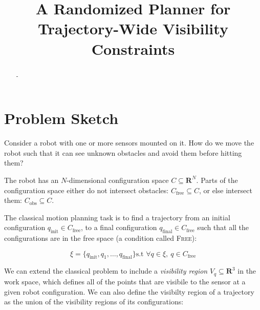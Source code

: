 \documentclass[conference]{IEEEtran}
\begin{document}
\title{A Randomized Planner for Trajectory-Wide Visibility Constraints}

\author{
}

\maketitle


\begin{abstract}
-
\end{abstract}

\IEEEpeerreviewmaketitle

\newcommand{\R}{\mathbf{R}}
\newcommand{\Cfree}{C_{\text{free}}}
\newcommand{\Cobs}{C_{\text{obs}}}
\newcommand{\qinit}{q_{\text{init}}}
\newcommand{\qfinal}{q_{\text{final}}}
\newcommand{\vis}{\textsc{Visible}}
\newcommand{\cfree}{\textsc{Free}}

\section{Problem Sketch}

Consider a robot with one or more sensors mounted on it.  How do we move the
robot such that it can see unknown obstacles and avoid them before hitting them?

The robot has an $N$-dimensional configuration space $C \subseteq \R^{N}$. Parts
of the configuration space either do not intersect obstacles: $\Cfree \subseteq C$,
or else intersect them: $\Cobs \subseteq C$. 

The classical motion planning task is to find a trajectory from an initial
configuration $\qinit \in \Cfree$, to a final configuration $\qfinal \in
\Cfree$ such that all the configurations are in the free space (a condition
called \cfree):

\begin{equation}
\xi =\{ \qinit, q_1, \ldots, \qfinal \} \text{s.t~} \forall q \in \xi,~ q\in
\Cfree 
\end{equation}

We can extend the classical problem to include a \textit{visibility region} $V_q
\subseteq \R^3$ in the work space, which defines all of the points that are
visibile to the sensor at a given robot configuration. We can also define the
visibilty region of a trajectory as the union of  the visibility regions of its
configurations:
\end{document}
